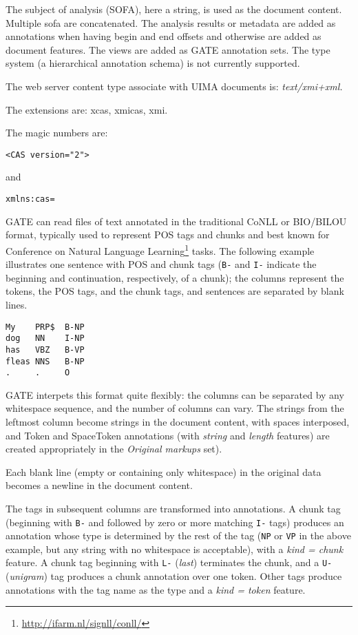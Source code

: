 The subject of analysis (SOFA), here a string, is used as the document
content. Multiple sofa are concatenated. The analysis results or metadata
are added as annotations when having begin and end offsets and otherwise are
added as document features. The views are added as GATE annotation sets.
The type system (a hierarchical annotation schema) is not currently
supported.

The web server content type associate with UIMA documents
is: {\em text/xmi+xml.}

The extensions are: xcas, xmicas, xmi.

The magic numbers are:
\begin{verbatim}
<CAS version="2">
\end{verbatim}
and
\begin{verbatim}
xmlns:cas=
\end{verbatim}

GATE can read files of text annotated in the traditional CoNLL or BIO/BILOU
format, typically used to represent POS tags and chunks and best known for
Conference on Natural Language
Learning\footnote{\url{http://ifarm.nl/signll/conll/}} tasks.  The following
example illustrates one sentence with POS and chunk tags (\texttt{B-} and
\texttt{I-} indicate the beginning and continuation, respectively, of a chunk);
the columns represent the tokens, the POS tags, and the chunk tags, and
sentences are separated by blank lines.
\begin{small}
\begin{verbatim}
My    PRP$  B-NP
dog   NN    I-NP
has   VBZ   B-VP
fleas NNS   B-NP
.     .     O
\end{verbatim}
\end{small}


GATE interpets this format quite flexibly: the columns can be separated by any
whitespace sequence, and the number of columns can vary.  The strings from the
leftmost column become strings in the document content, with spaces interposed,
and Token and SpaceToken annotations (with \emph{string} and \emph{length}
features) are created appropriately in the \emph{Original markups} set).  

Each blank line (empty or containing only whitespace) in the original data
becomes a newline in the document content.

The tags in subsequent columns are transformed into annotations.  A chunk tag
(beginning with \texttt{B-} and followed by zero or more matching \texttt{I-}
tags) produces an annotation whose type is determined by the rest of the tag
(\texttt{NP} or \texttt{VP} in the above example, but any string with no
whitespace is acceptable), with a \emph{kind = chunk} feature.  A chunk tag
beginning with \texttt{L-} (\emph{last}) terminates the chunk, and a \texttt{U-}
(\emph{unigram}) tag produces a chunk annotation over one token.  Other tags
produce annotations with the tag name as the type and a \emph{kind = token}
feature.

